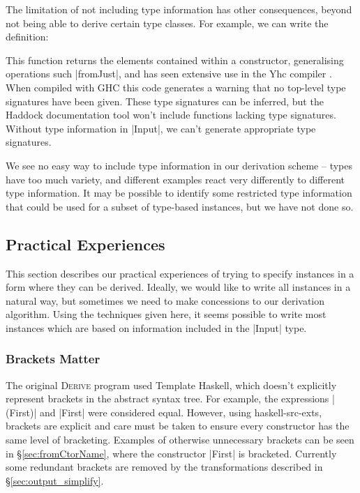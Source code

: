 \documentclass[preprint,draft]{sigplanconf}
\newcommand{\derive}{\textsc{Derive}}
\begin{document}
The limitation of not including type information has other consequences, beyond not being able to derive certain type classes. For example, we can write the definition:


This function returns the elements contained within a constructor, generalising operations such |fromJust|, and has seen extensive use in the Yhc compiler \cite{yhc}. When compiled with GHC this code generates a warning that no top-level type signatures have been given. These type signatures can be inferred, but the Haddock documentation tool \cite{haddock} won't include functions lacking type signatures. Without type information in |Input|, we can't generate appropriate type signatures.

We see no easy way to include type information in our derivation scheme -- types have too much variety, and different examples react very differently to different type information. It may be possible to identify some restricted type information that could be used for a subset of type-based instances, but we have not done so.

\subsection{Practical Experiences}

This section describes our practical experiences of trying to specify instances in a form where they can be derived. Ideally, we would like to write all instances in a natural way, but sometimes we need to make concessions to our derivation algorithm. Using the techniques given here, it seems possible to write most instances which are based on information included in the |Input| type.

\subsubsection{Brackets Matter}

The original \derive{} program used Template Haskell, which doesn't explicitly represent brackets in the abstract syntax tree. For example, the expressions |(First)| and |First| were considered equal. However, using haskell-src-exts, brackets are explicit and care must be taken to ensure every constructor has the same level of bracketing. Examples of otherwise unnecessary brackets can be seen in \S\ref{sec:fromCtorName}, where the constructor |First| is bracketed. Currently some redundant brackets are removed by the transformations described in \S\ref{sec:output_simplify}.
\end{document}
